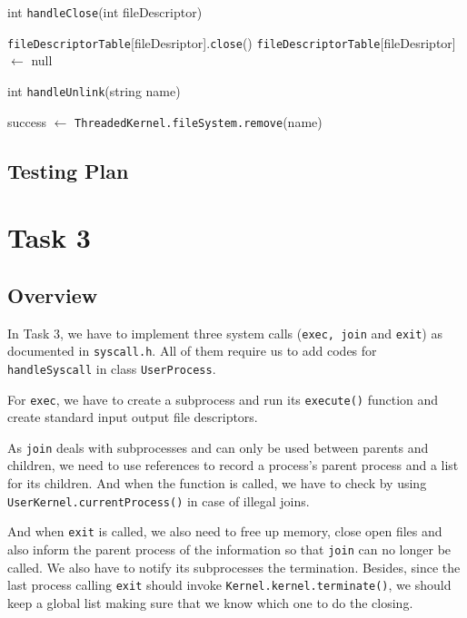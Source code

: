 \documentclass{article}
\begin{document}
\begin{spacing}{1.1}
\begin{algorithm}
  \caption{int \texttt{handleClose}(int fileDescriptor)}
\begin{algorithmic}[1]
  \ENDIF
  \STATE \texttt{fileDescriptorTable}[fileDesriptor].\texttt{close}()
  \STATE  \texttt{fileDescriptorTable}[fileDesriptor] $\leftarrow$ null
\end{algorithmic}
\end{algorithm}

\begin{algorithm}
  \caption{int \texttt{handleUnlink}(string name)}
\begin{algorithmic}[1]
  \STATE  success $\leftarrow$ \texttt{ThreadedKernel.fileSystem.remove}(name)
  \ENDIF
\end{algorithmic}
\end{algorithm}



\subsection{Testing Plan}




\section{Task 3}
\subsection{Overview}
In Task 3, we have to implement three system calls (\texttt{exec, join} and \texttt{exit}) as documented in \texttt{syscall.h}. All of them require us to add codes for \texttt{handleSyscall} in class \texttt{UserProcess}.

For \texttt{exec}, we have to create a subprocess and run its \texttt{execute()} function and create standard input output file descriptors.

As \texttt{join} deals with subprocesses and can only be used between parents and children, we need to use references to record a process's parent process and a list for its children. And when the function is called, we have to check by using \texttt{UserKernel.currentProcess()} in case of illegal joins.

And when \texttt{exit} is called, we also need to free up memory, close open files and also inform the parent process of the information so that \texttt{join} can no longer be called. We also have to notify its subprocesses the termination. Besides, since the last process calling \texttt{exit} should invoke \texttt{Kernel.kernel.terminate()}, we should keep a global list making sure that we know which one to do the closing.


\end{spacing}
\end{document}
